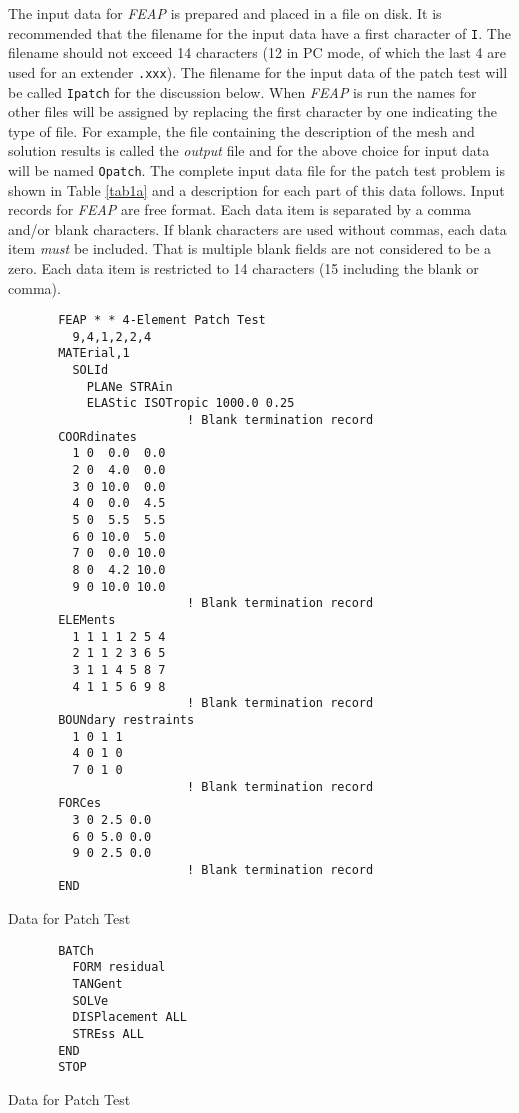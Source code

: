The input data for {\sl FEAP} is prepared and placed in a file on disk.
It is recommended that the filename for the input data have a first
character of {\tt I}.  The filename should not exceed 14 characters (12
in PC mode, of which the last 4 are used for an extender {\tt .xxx}).
The filename for the input data of the patch test will be
called {\tt Ipatch} for the discussion below.
When {\sl FEAP} is run the names for other files will be assigned by 
replacing the first character by one indicating the type of file.  For
example, the file containing the description of the mesh and solution
results is called the {\it output} file and for the above choice
for input data will be named {\tt Opatch}.
The complete input data file for the patch test
problem is shown in Table \ref{tab1a} and a 
description for each part of this data follows.
Input records for {\sl FEAP} are free format.  Each data item
is separated by a comma and/or blank characters.
If blank characters are used without commas, each data item {\it must} be
included.  That is multiple blank fields are not considered to be a zero.
Each data item is restricted to 14 characters (15 including the blank or
comma).

\begin{table}
\begin{verbatim}
       FEAP * * 4-Element Patch Test
         9,4,1,2,2,4
       MATErial,1
         SOLId
           PLANe STRAin
           ELAStic ISOTropic 1000.0 0.25
                         ! Blank termination record
       COORdinates
         1 0  0.0  0.0
         2 0  4.0  0.0
         3 0 10.0  0.0
         4 0  0.0  4.5
         5 0  5.5  5.5
         6 0 10.0  5.0
         7 0  0.0 10.0
         8 0  4.2 10.0
         9 0 10.0 10.0
                         ! Blank termination record
       ELEMents
         1 1 1 1 2 5 4
         2 1 1 2 3 6 5
         3 1 1 4 5 8 7
         4 1 1 5 6 9 8
                         ! Blank termination record
       BOUNdary restraints
         1 0 1 1
         4 0 1 0
         7 0 1 0
                         ! Blank termination record
       FORCes
         3 0 2.5 0.0
         6 0 5.0 0.0
         9 0 2.5 0.0
                         ! Blank termination record
       END
\end{verbatim}
\caption{Data for Patch Test}
\label{tab1a}
\end{table}

\begin{table}
\begin{verbatim}
       BATCh
         FORM residual
         TANGent
         SOLVe
         DISPlacement ALL
         STREss ALL
       END
       STOP
\end{verbatim}
\caption{Data for Patch Test}
\label{tab1b}
\end{table}

